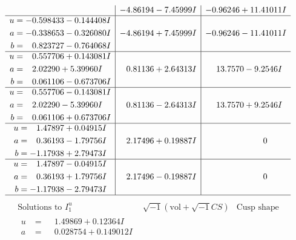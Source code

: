 \documentclass[1p]{elsarticle_modified}
\theoremstyle{definition}
\newcommand{\I}{\sqrt{-1}}
\begin{document}
$$\begin{array}{c|c|c}
 & -4.86194 - 7.45999 I & -0.96246 + 11.41011 I \\ \hline\begin{aligned}
u &= -0.598433 - 0.144408 I \\
a &= -0.338653 - 0.326080 I \\
b &= \phantom{-}0.823727 - 0.764068 I\end{aligned}
 & -4.86194 + 7.45999 I & -0.96246 - 11.41011 I \\ \hline\begin{aligned}
u &= \phantom{-}0.557706 + 0.143081 I \\
a &= \phantom{-}2.02290 + 5.39960 I \\
b &= \phantom{-}0.061106 - 0.673706 I\end{aligned}
 & \phantom{-}0.81136 + 2.64313 I & \phantom{-}13.7570 - 9.2546 I \\ \hline\begin{aligned}
u &= \phantom{-}0.557706 - 0.143081 I \\
a &= \phantom{-}2.02290 - 5.39960 I \\
b &= \phantom{-}0.061106 + 0.673706 I\end{aligned}
 & \phantom{-}0.81136 - 2.64313 I & \phantom{-}13.7570 + 9.2546 I \\ \hline\begin{aligned}
u &= \phantom{-}1.47897 + 0.04915 I \\
a &= \phantom{-}0.36193 - 1.79756 I \\
b &= -1.17938 + 2.79473 I\end{aligned}
 & \phantom{-}2.17496 + 0.19887 I & \phantom{-0.000000 } 0 \\ \hline\begin{aligned}
u &= \phantom{-}1.47897 - 0.04915 I \\
a &= \phantom{-}0.36193 + 1.79756 I \\
b &= -1.17938 - 2.79473 I\end{aligned}
 & \phantom{-}2.17496 - 0.19887 I & \phantom{-0.000000 } 0\\
 \hline 
 \end{array}$$\newpage$$\begin{array}{c|c|c}  
\text{Solutions to }I^u_{1}& \I (\text{vol} + \sqrt{-1}CS) & \text{Cusp shape}\\
 \hline 
\begin{aligned}
u &= \phantom{-}1.49869 + 0.12364 I \\
a &= \phantom{-}0.028754 + 0.149012 I \\

\end{aligned}
\end{array}$$
\end{document}
